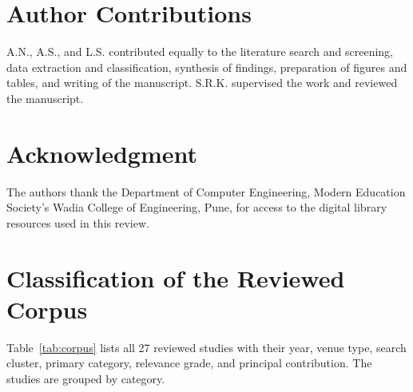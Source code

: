 \documentclass[journal]{IEEEtran}
\begin{document}
\section*{Author Contributions}

A.N., A.S., and L.S. contributed equally to the literature search and screening, data extraction and classification, synthesis of findings, preparation of figures and tables, and writing of the manuscript. S.R.K. supervised the work and reviewed the manuscript.

\section*{Acknowledgment}

The authors thank the Department of Computer Engineering, Modern Education Society's Wadia College of Engineering, Pune, for access to the digital library resources used in this review.

\appendices

\section{Classification of the Reviewed Corpus}

Table~\ref{tab:corpus} lists all 27 reviewed studies with their year, venue type, search cluster, primary category, relevance grade, and principal contribution. The studies are grouped by category.
\end{document}
